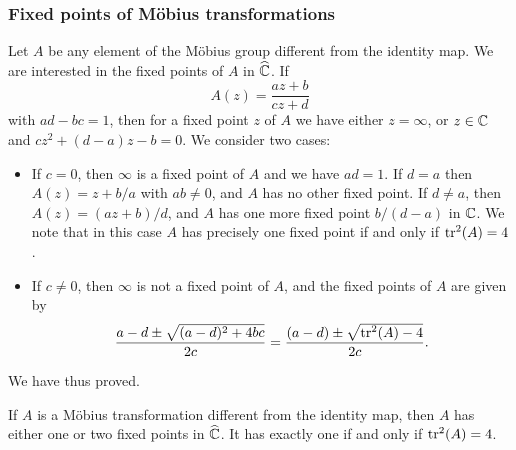 \subsubsection{Fixed points of M\"obius transformations}
Let $A$ be any element of the M\"obius group different from the identity map. We are interested in the fixed points of $A$ in $\widehat{\mathbb{C}}$. If
\[A(z)=\frac{az+b}{cz+d}\]
with $ad-bc=1$, then for a fixed point $z$ of $A$ we have either $z=\infty$, or $z\in\mathbb{C}$ and $cz^2+(d-a)z-b=0$. We consider two cases:
\begin{itemize}
\item If $c=0$, then $\infty$ is a fixed point of $A$ and we have $ad=1$. If $d=a$ then $A(z)=z+b/a$ with $ab\neq 0$, and $A$ has no other fixed point. If $d\neq a$, then $A(z)=(az+b)/d$, and $A$ has one more fixed point $b/(d-a)$ in $\mathbb{C}$. We note that in this case $A$ has precisely one fixed point if and only if $\mathrm{tr}^2(A)=4$.
\item If $c\neq 0$, then $\infty$ is not a fixed point of $A$, and the fixed points of $A$ are given by
\[\frac{a-d\pm\sqrt{(a-d)^2+4bc}}{2c}=\frac{(a-d)\pm\sqrt{\mathrm{tr}^2(A)-4}}{2c}.\]
\end{itemize}
We have thus proved.
\begin{proposition}\label{Mobious transform fixed point}
If $A$ is a M\"obius transformation different from the identity map, then $A$ has either one or two fixed points in $\widehat{\mathbb{C}}$. It has exactly one if and only if $\mathrm{tr}^2(A)=4$.
\end{proposition}
